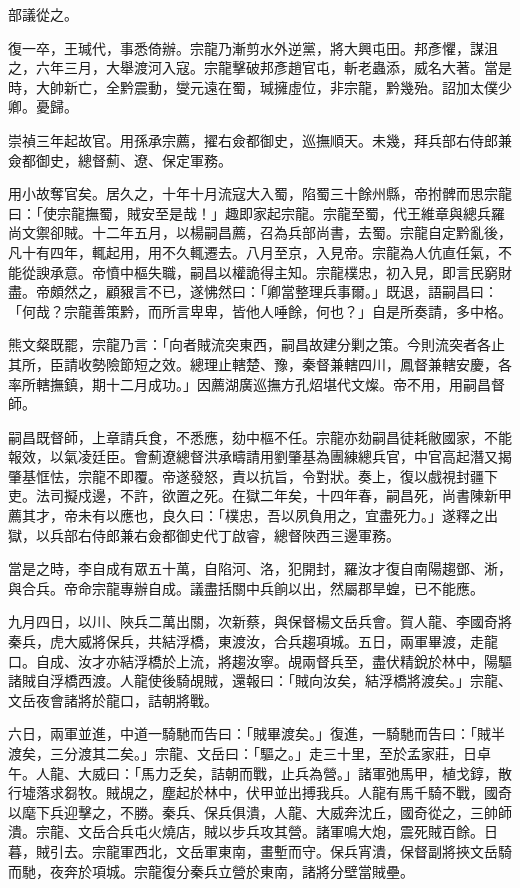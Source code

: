 \begin{pinyinscope}
部議從之。

復一卒，王瑊代，事悉倚辦。宗龍乃漸剪水外逆黨，將大興屯田。邦彥懼，謀沮之，六年三月，大舉渡河入寇。宗龍擊破邦彥趙官屯，斬老蟲添，威名大著。當是時，大帥新亡，全黔震動，燮元遠在蜀，瑊擁虛位，非宗龍，黔幾殆。詔加太僕少卿。憂歸。

崇禎三年起故官。用孫承宗薦，擢右僉都御史，巡撫順天。未幾，拜兵部右侍郎兼僉都御史，總督薊、遼、保定軍務。

用小故奪官矣。居久之，十年十月流寇大入蜀，陷蜀三十餘州縣，帝拊髀而思宗龍曰：「使宗龍撫蜀，賊安至是哉！」趣即家起宗龍。宗龍至蜀，代王維章與總兵羅尚文禦卻賊。十二年五月，以楊嗣昌薦，召為兵部尚書，去蜀。宗龍自定黔亂後，凡十有四年，輒起用，用不久輒遷去。八月至京，入見帝。宗龍為人伉直任氣，不能從諛承意。帝憤中樞失職，嗣昌以權詭得主知。宗龍樸忠，初入見，即言民窮財盡。帝頗然之，顧豤言不已，遂怫然曰：「卿當整理兵事爾。」既退，語嗣昌曰：「何哉？宗龍善策黔，而所言卑卑，皆他人唾餘，何也？」自是所奏請，多中格。

熊文粲既罷，宗龍乃言：「向者賊流突東西，嗣昌故建分剿之策。今則流突者各止其所，臣請收勢險節短之效。總理止轄楚、豫，秦督兼轄四川，鳳督兼轄安慶，各率所轄撫鎮，期十二月成功。」因薦湖廣巡撫方孔炤堪代文燦。帝不用，用嗣昌督師。

嗣昌既督師，上章請兵食，不悉應，劾中樞不任。宗龍亦劾嗣昌徒耗敝國家，不能報效，以氣凌廷臣。會薊遼總督洪承疇請用劉肇基為團練總兵官，中官高起潛又揭肇基恇怯，宗龍不即覆。帝遂發怒，責以抗旨，令對狀。奏上，復以戲視封疆下吏。法司擬戍邊，不許，欲置之死。在獄二年矣，十四年春，嗣昌死，尚書陳新甲薦其才，帝未有以應也，良久曰：「樸忠，吾以夙負用之，宜盡死力。」遂釋之出獄，以兵部右侍郎兼右僉都御史代丁啟睿，總督陜西三邊軍務。

當是之時，李自成有眾五十萬，自陷河、洛，犯開封，羅汝才復自南陽趨鄧、淅，與合兵。帝命宗龍專辦自成。議盡括關中兵餉以出，然屬郡旱蝗，已不能應。

九月四日，以川、陜兵二萬出關，次新蔡，與保督楊文岳兵會。賀人龍、李國奇將秦兵，虎大威將保兵，共結浮橋，東渡汝，合兵趨項城。五日，兩軍畢渡，走龍口。自成、汝才亦結浮橋於上流，將趨汝寧。覘兩督兵至，盡伏精銳於林中，陽驅諸賊自浮橋西渡。人龍使後騎覘賊，還報曰：「賊向汝矣，結浮橋將渡矣。」宗龍、文岳夜會諸將於龍口，詰朝將戰。

六日，兩軍並進，中道一騎馳而告曰：「賊畢渡矣。」復進，一騎馳而告曰：「賊半渡矣，三分渡其二矣。」宗龍、文岳曰：「驅之。」走三十里，至於孟家莊，日卓午。人龍、大威曰：「馬力乏矣，詰朝而戰，止兵為營。」諸軍弛馬甲，植戈錞，散行墟落求芻牧。賊覘之，塵起於林中，伏甲並出搏我兵。人龍有馬千騎不戰，國奇以麾下兵迎擊之，不勝。秦兵、保兵俱潰，人龍、大威奔沈丘，國奇從之，三帥師潰。宗龍、文岳合兵屯火燒店，賊以步兵攻其營。諸軍鳴大炮，震死賊百餘。日暮，賊引去。宗龍軍西北，文岳軍東南，畫塹而守。保兵宵潰，保督副將挾文岳騎而馳，夜奔於項城。宗龍復分秦兵立營於東南，諸將分壁當賊壘。


\end{pinyinscope}
